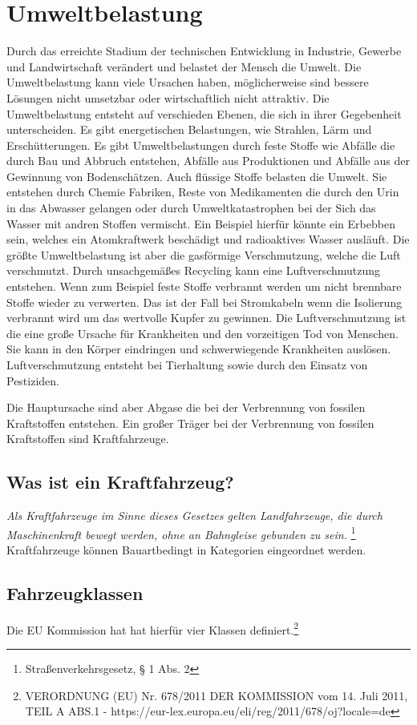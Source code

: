 \chapter{Umweltbelastung}
Durch das erreichte Stadium der technischen Entwicklung in Industrie, Gewerbe und Landwirtschaft verändert und belastet der Mensch die Umwelt.
Die Umweltbelastung kann viele Ursachen haben, möglicherweise sind bessere Lösungen nicht umsetzbar oder wirtschaftlich nicht attraktiv.
Die Umweltbelastung entsteht auf verschieden Ebenen, die sich in ihrer Gegebenheit unterscheiden.
Es gibt energetischen Belastungen, wie Strahlen, Lärm und Erschütterungen.
Es gibt Umweltbelastungen durch feste Stoffe wie Abfälle die durch Bau und Abbruch entstehen, Abfälle aus Produktionen und Abfälle aus der Gewinnung von Bodenschätzen.
Auch flüssige Stoffe belasten die Umwelt. Sie entstehen durch Chemie Fabriken, Reste von Medikamenten die durch den Urin in das Abwasser gelangen oder durch Umweltkatastrophen bei der Sich das Wasser mit andren Stoffen vermischt.
Ein Beispiel hierfür könnte ein Erbebben sein, welches ein Atomkraftwerk beschädigt und radioaktives Wasser ausläuft.
Die größte Umweltbelastung ist aber die gasförmige Verschmutzung, welche die Luft verschmutzt.
Durch unsachgemäßes Recycling kann eine Luftverschmutzung entstehen.
Wenn zum Beispiel feste Stoffe verbrannt werden um nicht brennbare Stoffe wieder zu verwerten.
Das ist der Fall bei Stromkabeln wenn die Isolierung verbrannt wird um das wertvolle Kupfer zu gewinnen.
Die Luftverschmutzung ist die eine große Ursache für Krankheiten und den vorzeitigen Tod von Menschen.
Sie kann in den Körper eindringen und schwerwiegende Krankheiten auslösen.
Luftverschmutzung entsteht bei Tierhaltung sowie durch den Einsatz von Pestiziden. 

Die Hauptursache sind aber Abgase die bei der Verbrennung von fossilen Kraftstoffen entstehen. 
Ein großer Träger bei der Verbrennung von fossilen Kraftstoffen sind Kraftfahrzeuge.


\section{Was ist ein Kraftfahrzeug?}
\textit{Als Kraftfahrzeuge im Sinne dieses Gesetzes gelten Landfahrzeuge, die durch Maschinenkraft bewegt werden, ohne an Bahngleise gebunden zu sein.}
\footnote{Straßenverkehrsgesetz, § 1 Abs. 2}
\newline
Kraftfahrzeuge können Bauartbedingt in Kategorien eingeordnet werden.
\section{Fahrzeugklassen}
Die EU Kommission hat hat hierfür vier Klassen definiert.\footnote{VERORDNUNG (EU) Nr. 678/2011 DER KOMMISSION
	vom 14. Juli 2011, TEIL A ABS.1 - https://eur-lex.europa.eu/eli/reg/2011/678/oj?locale=de}

